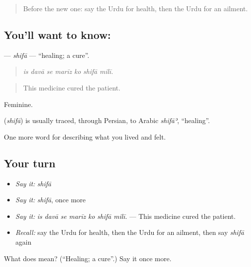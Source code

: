 \begin{quote}
Before the new one: say the Urdu for health, then the Urdu for an ailment.
\end{quote}

\subsection*{You'll want to know: }
\textbf{} — \emph{shifā} — \textquotedblleft{}healing; a cure\textquotedblright{}.

\begin{quote}
      
\end{quote}

\begin{quote}
\emph{is davā se marīz ko shifā milī.}
\end{quote}

\begin{quote}
This medicine cured the patient.
\end{quote}

Feminine.

\begin{cousinweb}
\textbf{} (\emph{shifā}) is usually traced, through Persian, to Arabic \emph{shifāʾ}, \textquotedblleft{}healing\textquotedblright{}.
\end{cousinweb}

\begin{grammarlens}[title={What you've built}]
One more word for describing what you lived and felt.
\end{grammarlens}

\subsection*{Your turn}
\begin{itemize}
\raggedright
  \item \emph{Say it:} \emph{shifā}
  \item \emph{Say it:} \emph{shifā}, once more
  \item \emph{Say it:} \emph{is davā se marīz ko shifā milī.} — This medicine cured the patient.
  \item \emph{Recall:} say the Urdu for health, then the Urdu for an ailment, then say \emph{shifā} again
\end{itemize}

\begin{tcolorbox}[breakable,colback=teal!4,colframe=teal!35!black,title={Before you move on}]
What does  mean? (\textquotedblleft{}Healing; a cure\textquotedblright{}.) Say it once more.
\end{tcolorbox}
